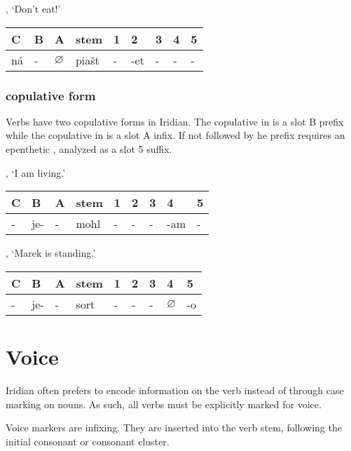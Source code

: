 \a {}, `Don't eat!'
\begin{center}
	\small
	\begin{tabu}to \textwidth{MMMM[1.5]MMMMM}
		\toprule
		C&B&A&{\sc stem}&1&2&3&4&5\\
		\midrule
		\addlinespace
		ná&-&$\varnothing$&pia\v{s}t&-&-et&-&-&-\\
		\bottomrule
	\end{tabu}
\end{center}
\xe

\subsubsection{copulative form}
\par Verbs have two copulative forms in Iridian. The copulative in  is a slot B prefix while the copulative in  is a slot A infix. If not followed by he prefix  requires an epenthetic , analyzed as a slot 5 suffix.

\ex {}, `I am living.'

\begin{center}
	\small
	\begin{tabu}to \textwidth{MMMM[1.5]MMMMM}
		\toprule
		C&B&A&{\sc stem}&1&2&3&4&5\\
		\midrule
		\addlinespace
		-&je-&-&mohl&-&-&-&-am&-\\
		\bottomrule
	\end{tabu}
\end{center}
\xe

\ex {}, `Marek is standing.'

\begin{center}
	\small
	\begin{tabu}to \textwidth{MMMM[1.5]MMMMM}
		\toprule
		C&B&A&{\sc stem}&1&2&3&4&5\\
		\midrule
		\addlinespace
		-&je-&-&sort&-&-&-&$\varnothing$&-o\\
		\bottomrule
	\end{tabu}
\end{center}
\xe

\section{Voice}

\par Iridian often prefers to encode information on the verb instead of through case marking on nouns. As such, all verbs must be explicitly marked for voice.
\par Voice markers are infixing. They are inserted into the verb stem, following the initial consonant or consonant cluster. 

